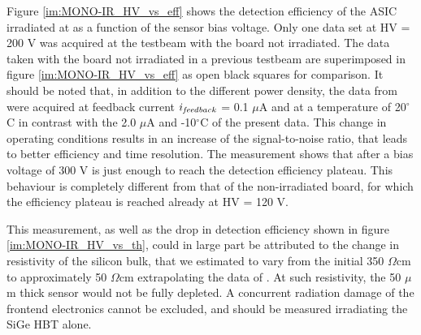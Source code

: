 		Figure \ref{im:MONO-IR_HV_vs_eff} shows the detection efficiency of the ASIC irradiated at \maxflu as a function of the sensor bias voltage. 
		Only one data set at HV = 200 V was acquired at the testbeam with the board not irradiated. The data taken with the board not irradiated in a previous testbeam \cite{Monolith_20ps} are superimposed in figure \ref{im:MONO-IR_HV_vs_eff} as open black squares for comparison. It should be noted that, in addition to the different power density, the data from \cite{Monolith_20ps} were acquired at feedback current $i_{\it feedback}$ = 0.1 $\mu$A and at a temperature of 20$^\circ$C in contrast with the 2.0 $\mu$A and -10$^\circ$C of the present data. This change in operating conditions results in an increase of the signal-to-noise ratio, that leads to better efficiency and time resolution.
		The measurement shows that after \maxflu a bias voltage of 300 V is just enough to reach the detection efficiency plateau. This behaviour is completely different from that of the non-irradiated board, for which the efficiency plateau is reached already at HV = 120 V.

		This measurement, as well as the drop in detection efficiency shown in figure \ref{im:MONO-IR_HV_vs_th}, could in large part be attributed to the change in resistivity of the silicon bulk, that we estimated to vary from the initial 350 $\Omega$cm to approximately 50 $\Omega$cm extrapolating the data of \cite{RadiationDamageBruzzi, DisplacementDamageMoll}.
		At such resistivity, the 50 $\mu$m thick sensor would not be fully depleted.
		A concurrent radiation damage of the frontend electronics cannot be excluded, and should be measured irradiating the SiGe HBT alone.


